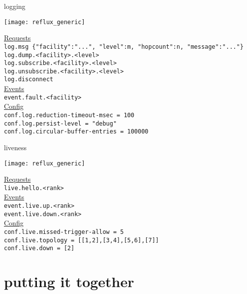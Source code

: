 \documentclass[default,pdf,colorBG,slideColor]{prosper}
\begin{document}
\begin{slide}{logging}{\tiny
\begin{center}
  \texttt{[image: reflux\_generic]}
\end{center}
\underline{Requests}\\
{\tt log.msg \{"facility":"...", "level":m, "hopcount":n, "message":"..."\}}\\
{\tt log.dump.<facility>.<level>}\\
{\tt log.subscribe.<facility>.<level>}\\
{\tt log.unsubscribe.<facility>.<level>}\\
{\tt log.disconnect}\\
\underline{Events}\\
{\tt event.fault.<facility>}\\
\underline{Config}\\
{\tt conf.log.reduction-timeout-msec = 100}\\
{\tt conf.log.persist-level = "debug"}\\
{\tt conf.log.circular-buffer-entries = 100000}\\
}\end{slide}

\begin{slide}{liveness}{\tiny
\begin{center}
  \texttt{[image: reflux\_generic]}
\end{center}
\underline{Requests}\\
{\tt live.hello.<rank>}\\
\underline{Events}\\
{\tt event.live.up.<rank>}\\
{\tt event.live.down.<rank>}\\
\underline{Config}\\
{\tt conf.live.missed-trigger-allow = 5}\\
{\tt conf.live.topology = [[1,2],[3,4],[5,6],[7]]}\\
{\tt conf.live.down = [2]}\\
}\end{slide}

\part{putting it together}
\end{document}

